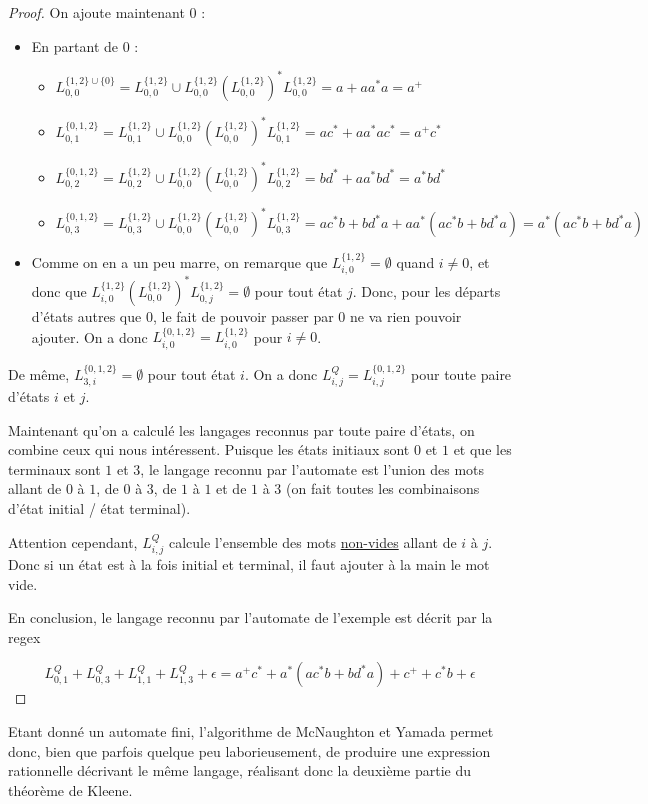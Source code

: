 \begin{proof}
On ajoute maintenant $0$ : 


\begin{itemize}
\item En partant de $0$ :
   \begin{itemize}
	 \item $L_{0,0}^{\{1,2\} \cup \{0\}} = L_{0,0}^{\{1,2\}} \cup L_{0,0}^{\{1,2\}}(L_{0,0}^{\{1,2\}})^*L_{0,0}^{\{1,2\}} = a + aa^*a = a^+$
	 \item $L_{0,1}^{\{0,1,2\}} = L_{0,1}^{\{1,2\}} \cup L_{0,0}^{\{1,2\}}(L_{0,0}^{\{1,2\}})^*L_{0,1}^{\{1,2\}} = ac^* + aa^*ac^* = a^+c^*$
	 \item $L_{0,2}^{\{0,1,2\}} = L_{0,2}^{\{1,2\}} \cup L_{0,0}^{\{1,2\}}(L_{0,0}^{\{1,2\}})^*L_{0,2}^{\{1,2\}} = bd^* + aa^*bd^* = a^*bd^*$
	 \item $L_{0,3}^{\{0,1,2\}} = L_{0,3}^{\{1,2\}} \cup L_{0,0}^{\{1,2\}}(L_{0,0}^{\{1,2\}})^*L_{0,3}^{\{1,2\}} = ac^*b + bd^*a + aa^*(ac^*b + bd^*a) = a^*(ac^*b + bd^*a)$
   \end{itemize}
\item Comme on en a un peu marre, on remarque que $L_{i,0}^{\{1,2\}} = \emptyset$ quand $i \neq 0$, et donc que $L_{i,0}^{\{1,2\}}(L_{0,0}^{\{1,2\}})^*L_{0,j}^{\{1,2\}} = \emptyset$ pour tout état $j$. Donc, pour les départs d'états autres que $0$, le fait de pouvoir passer par $0$ ne va rien pouvoir ajouter. On a donc $L_{i,0}^{\{0,1,2\}} = L_{i,0}^{\{1,2\}}$ pour $i \neq 0$.
\end{itemize}

De même, $L_{3,i}^{\{0,1,2\}} = \emptyset$ pour tout état $i$. On a donc $L_{i,j}^Q = L_{i,j}^{\{0,1,2\}}$ pour toute paire d'états $i$ et $j$. 


Maintenant qu'on a calculé les langages reconnus par toute paire d'états, on combine ceux qui nous intéressent. Puisque les états initiaux sont $0$ et $1$ et que les terminaux sont $1$ et $3$, le langage reconnu par l'automate est l'union des mots allant de $0$ à $1$, de $0$ à $3$, de $1$ à $1$ et de $1$ à $3$ (on fait toutes les combinaisons d'état initial / état terminal).

Attention cependant, $L_{i,j}^Q$ calcule l'ensemble des mots \underline{non-vides} allant de $i$ à $j$. Donc si un état est à la fois initial et terminal, il faut ajouter à la main le mot vide.

En conclusion, le langage reconnu par l'automate de l'exemple est décrit par la regex 

\[
L_{0,1}^Q + L_{0,3}^Q + L_{1,1}^Q + L_{1,3}^Q + \epsilon = a^+c^* + a^*(ac^*b + bd^*a) + c^+ + c^*b + \epsilon
\]

\end{proof}

Etant donné un automate fini, l'algorithme de McNaughton et Yamada permet donc, bien que parfois quelque peu laborieusement, de produire une expression rationnelle décrivant le même langage, réalisant donc la deuxième partie du théorème de Kleene.
